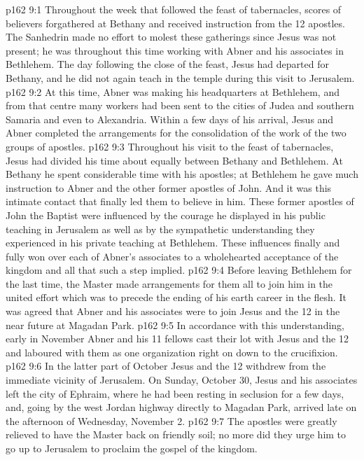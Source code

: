 \vs p162 9:1 Throughout the week that followed the feast of tabernacles, scores of believers forgathered at Bethany and received instruction from the 12 apostles. The Sanhedrin made no effort to molest these gatherings since Jesus was not present; he was throughout this time working with Abner and his associates in Bethlehem. The day following the close of the feast, Jesus had departed for Bethany, and he did not again teach in the temple during this visit to Jerusalem.
\vs p162 9:2 \pc At this time, Abner was making his headquarters at Bethlehem, and from that centre many workers had been sent to the cities of Judea and southern Samaria and even to Alexandria. Within a few days of his arrival, Jesus and Abner completed the arrangements for the consolidation of the work of the two groups of apostles.
\vs p162 9:3 Throughout his visit to the feast of tabernacles, Jesus had divided his time about equally between Bethany and Bethlehem. At Bethany he spent considerable time with his apostles; at Bethlehem he gave much instruction to Abner and the other former apostles of John. And it was this intimate contact that finally led them to believe in him. These former apostles of John the Baptist were influenced by the courage he displayed in his public teaching in Jerusalem as well as by the sympathetic understanding they experienced in his private teaching at Bethlehem. These influences finally and fully won over each of Abner’s associates to a wholehearted acceptance of the kingdom and all that such a step implied.
\vs p162 9:4 \pc Before leaving Bethlehem for the last time, the Master made arrangements for them all to join him in the united effort which was to precede the ending of his earth career in the flesh. It was agreed that Abner and his associates were to join Jesus and the 12 in the near future at Magadan Park.
\vs p162 9:5 In accordance with this understanding, early in November Abner and his 11 fellows cast their lot with Jesus and the 12 and laboured with them as one organization right on down to the crucifixion.
\vs p162 9:6 In the latter part of October Jesus and the 12 withdrew from the immediate vicinity of Jerusalem. On Sunday, October 30, Jesus and his associates left the city of Ephraim, where he had been resting in seclusion for a few days, and, going by the west Jordan highway directly to Magadan Park, arrived late on the afternoon of Wednesday, November 2.
\vs p162 9:7 The apostles were greatly relieved to have the Master back on friendly soil; no more did they urge him to go up to Jerusalem to proclaim the gospel of the kingdom.
\quizlink
